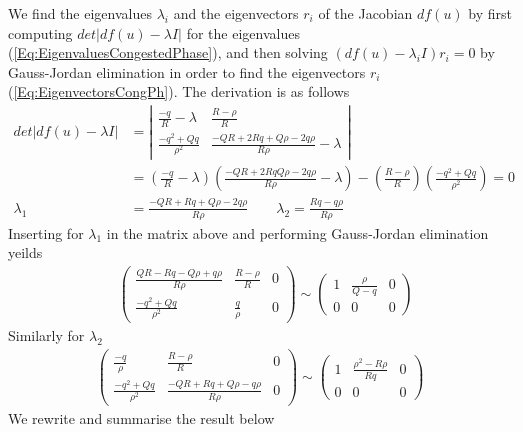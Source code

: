 \documentclass[10pt]{article}
\numberwithin{equation}{section}
\begin{document}
We find the eigenvalues $\lambda_i$ and the eigenvectors $r_i$ of the Jacobian $df(u)$ by first computing $ det| df(u) - \lambda I| $ for the eigenvalues (\ref{Eq:EigenvaluesCongestedPhase}), and then solving $(df(u) - \lambda_i I) r_i  = 0$ by Gauss-Jordan elimination in order to find the eigenvectors $r_i$ (\ref{Eq:EigenvectorsCongPh}). The derivation is as follows 
\begin{align*}
   det| df(u) - \lambda I | &= \left|\begin{matrix}
\frac{-q}{R}-\lambda & \frac{R-\rho}{R} \\
\frac{-q^2+Qq}{\rho^2} & \frac{-QR+2Rq+Q\rho-2q\rho}{R\rho}-\lambda
\end{matrix}\right| \\
&= (\frac{-q}{R}-\lambda)( \frac{-QR+2RqQ\rho-2q\rho}{R\rho}-\lambda) - (\frac{R-\rho}{R})(\frac{-q^2+Qq}{\rho^2}) = 0 \\
 \lambda_1 &= \frac{-QR + Rq + Q\rho -2q\rho}{R\rho} \quad \quad  \lambda_2 = \frac{Rq - q\rho}{R\rho} 
\end{align*}
Inserting for $\lambda_1$ in the matrix above and performing Gauss-Jordan elimination yeilds 
\begin{align*}
   & \left(\begin{array}{cc|c}
\frac{QR-Rq-Q\rho+q\rho}{R\rho} & \frac{R-\rho}{R} & 0 \\
\frac{-q^2+Qq}{\rho^2} & \frac{q}{\rho} & 0
\end{array}\right) \sim  \left(\begin{array}{cc|c}
1 & \frac{\rho}{Q-q} & 0 \\
0 & 0 & 0
\end{array}\right)
\end{align*}
Similarly for $\lambda_2$
\begin{align*}
    \left(\begin{array}{cc|c}
\frac{-q}{\rho} & \frac{R-\rho}{R} & 0\\
\frac{-q^2+Qq}{\rho^2} & \frac{-QR+Rq+Q\rho-q\rho}{R\rho} & 0
\end{array}\right) \sim \left(\begin{array}{cc|c}
1 & \frac{\rho^2-R\rho}{Rq} & 0 \\
0 & 0 & 0
\end{array}\right)
\end{align*}
We rewrite and summarise the result below
\end{document}
